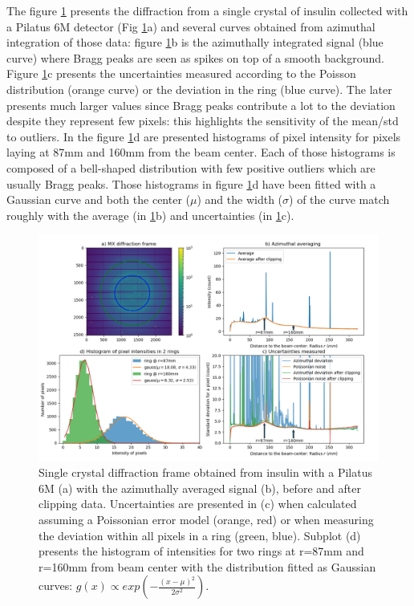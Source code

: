 \documentclass[preprint]{iucr}              %
\begin{document}
The figure \ref{fig2} presents the diffraction from a single crystal of insulin collected with a Pilatus 6M detector (Fig \ref{fig2}a) and several curves obtained from azimuthal integration of those data: 
figure \ref{fig2}b is the azimuthally integrated signal (blue curve) where Bragg peaks are seen as spikes on top of a smooth background.
Figure \ref{fig2}c presents the uncertainties measured according to the Poisson distribution (orange curve) %
or the deviation in the ring (blue curve). 
The later presents much larger values since Bragg peaks contribute a lot to the deviation despite they represent few pixels: this highlights the sensitivity of the mean/std to outliers.
In the figure \ref{fig2}d are presented histograms of pixel intensity for pixels laying at 87mm and 160mm from the beam center. 
Each of those histograms is composed of a bell-shaped distribution with 
few positive outliers which are usually Bragg peaks.   
Those histograms in figure \ref{fig2}d have been fitted with a Gaussian curve and both the center ($\mu$) and the width ($\sigma$) of the curve match 
roughly with the average (in \ref{fig2}b) and uncertainties (in \ref{fig2}c).  
\begin{figure}
\label{fig2}
\begin{center}
\includegraphics[width=14cm]{fig2}
\caption{Single crystal diffraction frame obtained from insulin with a Pilatus 6M (a) with the azimuthally averaged signal (b), 
before and after clipping data. Uncertainties are presented in (c) when calculated assuming a Poissonian error model (orange, red) or when measuring the deviation within all pixels in a ring (green, blue).
Subplot (d) presents the histogram of intensities for two rings at r=87mm and r=160mm from beam center with the distribution fitted as Gaussian curves: $g(x)\propto exp(-\frac{(x-\mu)^2}{2\sigma^2})$.}
\end{center}
\end{figure}
\end{document}
